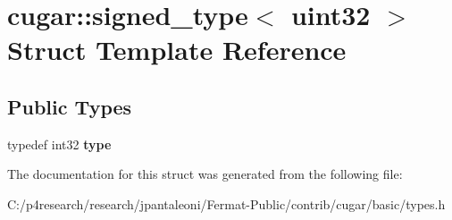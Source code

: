 \hypertarget{structcugar_1_1signed__type_3_01uint32_01_4}{}\section{cugar\+:\+:signed\+\_\+type$<$ uint32 $>$ Struct Template Reference}
\label{structcugar_1_1signed__type_3_01uint32_01_4}
\subsection*{Public Types}
\begin{DoxyCompactItemize}
\item 
\mbox{\label{structcugar_1_1signed__type_3_01uint32_01_4_ac4c6cd7a6a3ef5f6ee46da1c1df917ab}} 
typedef int32 {\bfseries type}
\end{DoxyCompactItemize}


The documentation for this struct was generated from the following file\+:\begin{DoxyCompactItemize}
\item 
C\+:/p4research/research/jpantaleoni/\+Fermat-\/\+Public/contrib/cugar/basic/types.\+h\end{DoxyCompactItemize}
